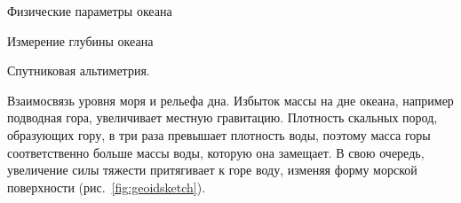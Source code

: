 \begin{chapter}{Физические параметры океана}
\begin{section}{Измерение глубины океана}
\begin{paragraph}{Спутниковая альтиметрия.}
\begin{subparagraph}{Взаимосвязь уровня моря и рельефа дна.}
Избыток массы на дне океана, например подводная гора, увеличивает местную
гравитацию. Плотность скальных пород, образующих гору, в три раза превышает
плотность воды, поэтому масса горы соответственно больше массы воды, 
которую она замещает. В свою очередь, увеличение силы тяжести притягивает 
к горе воду, изменяя форму морской поверхности (рис.~\ref{fig:geoidsketch}).
%


\end{subparagraph}
\end{paragraph}
\end{section}
\end{chapter}
